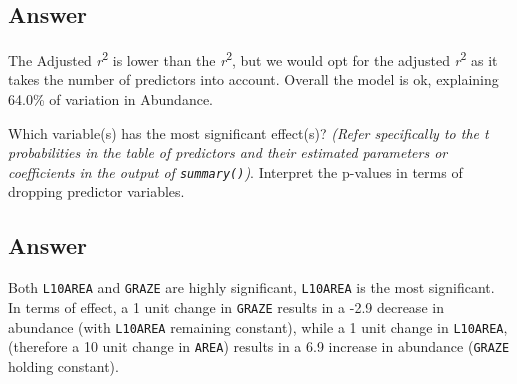 \documentclass[
  10pt,
  letterpaper,
  DIV=11,
  numbers=noendperiod]{scrartcl}
\newenvironment{Shaded}{\begin{snugshade}}{\end{snugshade}}
\newcommand{\FunctionTok}[1]{\textcolor[rgb]{0.28,0.35,0.67}{#1}}
\newcommand{\NormalTok}[1]{\textcolor[rgb]{0.00,0.23,0.31}{#1}}
\newcommand{\SpecialCharTok}[1]{\textcolor[rgb]{0.37,0.37,0.37}{#1}}
\begin{document}
\begin{Shaded}
\end{Shaded}

\hypertarget{answer-8}{%
\subsection{Answer}\label{answer-8}}

The Adjusted \emph{r}\textsuperscript{2} is lower than the
\emph{r}\textsuperscript{2}, but we would opt for the adjusted
\emph{r}\textsuperscript{2} as it takes the number of predictors into
account. Overall the model is ok, explaining 64.0\% of variation in
Abundance.

\begin{tcolorbox}[enhanced jigsaw, rightrule=.15mm, coltitle=black, leftrule=.75mm, titlerule=0mm, breakable, toprule=.15mm, bottomtitle=1mm, colback=white, toptitle=1mm, opacitybacktitle=0.6, bottomrule=.15mm, arc=.35mm, left=2mm, title=\textcolor{quarto-callout-warning-color}{\faExclamationTriangle}\hspace{0.5em}{Question 4}, colbacktitle=quarto-callout-warning-color!10!white, opacityback=0, colframe=quarto-callout-warning-color-frame]

Which variable(s) has the most significant effect(s)? \emph{(Refer
specifically to the t probabilities in the table of predictors and their
estimated parameters or coefficients in the output of
\texttt{summary()})}. Interpret the p-values in terms of dropping
predictor variables.

\end{tcolorbox}

\hypertarget{answer-9}{%
\subsection{Answer}\label{answer-9}}

Both \texttt{L10AREA} and \texttt{GRAZE} are highly significant,
\texttt{L10AREA} is the most significant. In terms of effect, a 1 unit
change in \texttt{GRAZE} results in a -2.9 decrease in abundance (with
\texttt{L10AREA} remaining constant), while a 1 unit change in
\texttt{L10AREA}, (therefore a 10 unit change in \texttt{AREA}) results
in a 6.9 increase in abundance (\texttt{GRAZE} holding constant).
\end{document}
